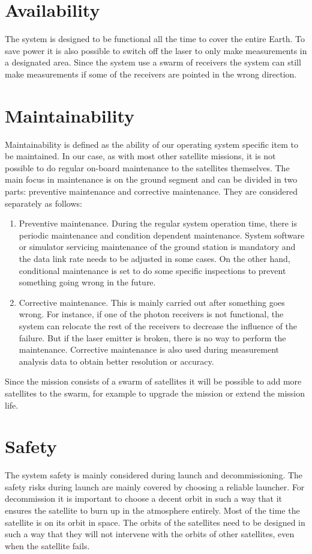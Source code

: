\section{Availability}
\label{blRAMSavail}
The system is designed to be functional all the time to cover the entire Earth. To save power it is also possible to switch off the laser to only make measurements in a designated area. Since the system use a swarm of receivers the system can still make measurements if some of the receivers are pointed in the wrong direction.

\section{Maintainability}
\label{blRAMSmaint}
Maintainability is defined as the ability of our operating system specific item to be maintained. In our case, as with most other satellite missions, it is not possible to do regular on-board maintenance to the satellites themselves. The main focus in maintenance is on the ground segment and can be divided in two parts: preventive maintenance and corrective maintenance. They are considered separately as follows: 
	\begin{enumerate}
		\item Preventive maintenance. During the regular system operation time, there is periodic maintenance and condition dependent maintenance.  System software or simulator servicing maintenance of the ground station is mandatory and the data link rate needs to be adjusted in some cases. On the other hand, conditional maintenance is set to do some specific inspections to prevent something going wrong in the future.
		\item Corrective maintenance. This is mainly carried out after something goes wrong. For instance, if one of the photon receivers is not functional, the system can relocate the rest of the receivers to decrease the influence of the failure. But if the laser emitter is broken, there is no way to perform the maintenance. Corrective maintenance is also used during measurement analysis data to obtain better resolution or accuracy.
  	\end{enumerate}
Since the mission consists of a swarm of satellites it will be possible to add more satellites to the swarm, for example to upgrade the mission or extend the mission life. 

\section{Safety}
\label{blRAMSsaf} 
The system safety is mainly considered during launch and decommissioning. The safety risks during launch are mainly covered by choosing a reliable launcher. For decommission it is important to choose a decent orbit in such a way that it ensures the satellite to burn up in the atmosphere entirely. Most of the time the satellite is on its orbit in space. The orbits of the satellites need to be designed in such a way that they will not intervene with the orbits of other satellites, even when the satellite fails. 